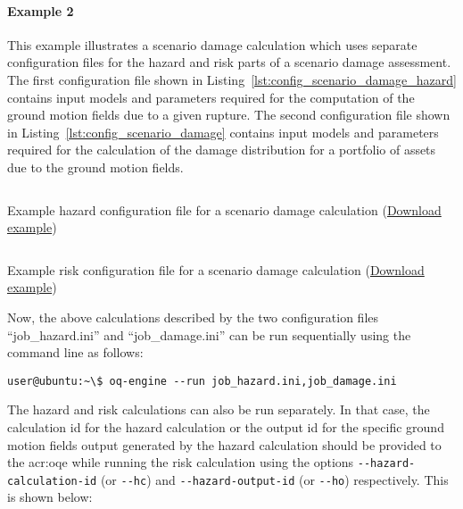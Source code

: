 \paragraph{Example 2}

This example illustrates a scenario damage calculation which uses separate
configuration files for the hazard and risk parts of a scenario damage
assessment. The first configuration file shown in
Listing~\ref{lst:config_scenario_damage_hazard} contains input models and
parameters required for the computation of the ground motion fields due to a
given rupture. The second configuration file shown in
Listing~\ref{lst:config_scenario_damage} contains input models and parameters
required for the calculation of the damage distribution for a portfolio of
assets due to the ground motion fields.

\begin{listing}[htbp]
  \inputminted[firstline=1,firstnumber=1,fontsize=\footnotesize,frame=single,linenos,bgcolor=lightgray,label=job\_hazard.ini]{ini}{oqum/risk/verbatim/config_scenario_hazard.ini}
  \caption{Example hazard configuration file for a scenario damage calculation (\href{https://raw.githubusercontent.com/GEMScienceTools/oq-engine-docs/master/oqum/risk/verbatim/config_scenario_hazard.xml}{Download example})}
  \label{lst:config_scenario_damage_hazard}
\end{listing}

\begin{listing}[htbp]
  \inputminted[firstline=1,firstnumber=1,fontsize=\footnotesize,frame=single,linenos,bgcolor=lightgray,label=job\_damage.ini]{ini}{oqum/risk/verbatim/config_scenario_damage.ini}
  \caption{Example risk configuration file for a scenario damage calculation (\href{https://raw.githubusercontent.com/GEMScienceTools/oq-engine-docs/master/oqum/risk/verbatim/config_scenario_damage.xml}{Download example})}
  \label{lst:config_scenario_damage}
\end{listing}

Now, the above calculations described by the two configuration files
``job\_hazard.ini'' and ``job\_damage.ini'' can be run sequentially using the
command line as follows:

\begin{verbatim}
user@ubuntu:~\$ oq-engine --run job_hazard.ini,job_damage.ini
\end{verbatim}

The hazard and risk calculations can also be run separately. In that case, the
calculation id for the hazard calculation or the output id for the specific
ground motion fields output generated by the hazard calculation should be
provided to the \glsdesc{acr:oqe} while running the risk calculation using the
options \Verb+--hazard-calculation-id+ (or \Verb+--hc+) and 
\Verb+--hazard-output-id+ (or \Verb+--ho+) respectively. This is shown below:

